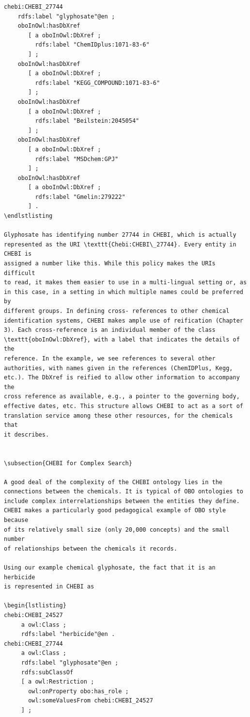 \begin{lstlisting}
chebi:CHEBI_27744
    rdfs:label "glyphosate"@en ;
    oboInOwl:hasDbXref
       [ a oboInOwl:DbXref ;
         rdfs:label "ChemIDplus:1071-83-6"
       ] ;
    oboInOwl:hasDbXref
       [ a oboInOwl:DbXref ;
         rdfs:label "KEGG_COMPOUND:1071-83-6"
       ] ;
    oboInOwl:hasDbXref
       [ a oboInOwl:DbXref ;
         rdfs:label "Beilstein:2045054"
       ] ;
    oboInOwl:hasDbXref
       [ a oboInOwl:DbXref ;
         rdfs:label "MSDchem:GPJ"
       ] ;
    oboInOwl:hasDbXref
       [ a oboInOwl:DbXref ;
         rdfs:label "Gmelin:279222"
       ] .
\endlstlisting

Glyphosate has identifying number 27744 in CHEBI, which is actually
represented as the URI \texttt{Chebi:CHEBI\_27744}. Every entity in CHEBI is
assigned a number like this. While this policy makes the URIs difficult
to read, it makes them easier to use in a multi-lingual setting or, as
in this case, in a setting in which multiple names could be preferred by
different groups. In defining cross- references to other chemical
identification systems, CHEBI makes ample use of reification (Chapter
3). Each cross-reference is an individual member of the class
\texttt{oboInOwl:DbXref}, with a label that indicates the details of the
reference. In the example, we see references to several other
authorities, with names given in the references (ChemIDPlus, Kegg,
etc.). The DbXref is reified to allow other information to accompany the
cross reference as available, e.g., a pointer to the governing body,
effective dates, etc. This structure allows CHEBI to act as a sort of
translation service among these other resources, for the chemicals that
it describes.


\subsection{CHEBI for Complex Search}

A good deal of the complexity of the CHEBI ontology lies in the
connections between the chemicals. It is typical of OBO ontologies to
include complex interrelationships between the entities they define.
CHEBI makes a particularly good pedagogical example of OBO style because
of its relatively small size (only 20,000 concepts) and the small number
of relationships between the chemicals it records.

Using our example chemical glyphosate, the fact that it is an herbicide
is represented in CHEBI as

\begin{lstlisting}
chebi:CHEBI_24527
     a owl:Class ;
     rdfs:label "herbicide"@en .
chebi:CHEBI_27744
     a owl:Class ;
     rdfs:label "glyphosate"@en ;
     rdfs:subClassOf
     [ a owl:Restriction ;
       owl:onProperty obo:has_role ;
       owl:someValuesFrom chebi:CHEBI_24527
     ] ;
\end{lstlisting}


